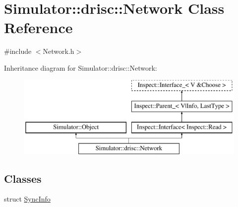 \hypertarget{class_simulator_1_1drisc_1_1_network}{\section{Simulator\+:\+:drisc\+:\+:Network Class Reference}
\label{class_simulator_1_1drisc_1_1_network}
}


{\ttfamily \#include $<$Network.\+h$>$}

Inheritance diagram for Simulator\+:\+:drisc\+:\+:Network\+:\begin{figure}[H]
\begin{center}
\leavevmode
\includegraphics[height=4.000000cm]{class_simulator_1_1drisc_1_1_network}
\end{center}
\end{figure}
\subsection*{Classes}
\begin{DoxyCompactItemize}
\item 
struct \hyperlink{struct_simulator_1_1drisc_1_1_network_1_1_sync_info}{Sync\+Info}
\end{DoxyCompactItemize}
